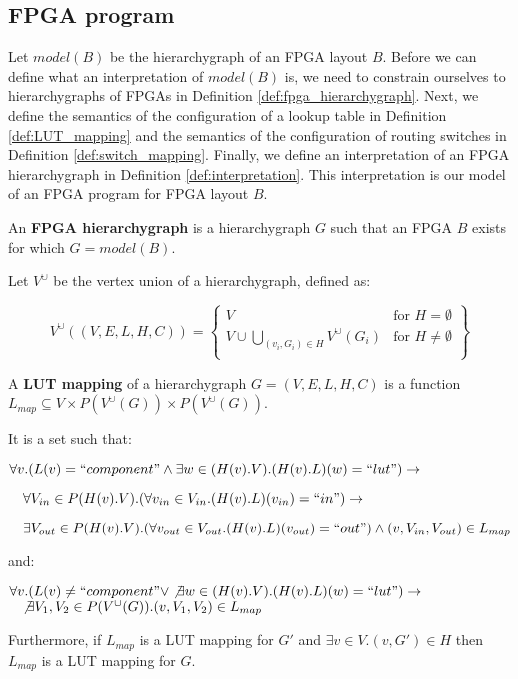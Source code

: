 \subsection{FPGA program}
Let $model(B)$ be the hierarchygraph of an FPGA layout $B$. Before we can define what an interpretation of $model(B)$ is, we need to constrain ourselves to hierarchygraphs of FPGAs in Definition \ref{def:fpga_hierarchygraph}. Next, we define the semantics of the configuration of a lookup table in Definition \ref{def:LUT_mapping} and the semantics of the configuration of routing switches in Definition \ref{def:switch_mapping}. Finally, we define an interpretation of an FPGA hierarchygraph in Definition \ref{def:interpretation}. This interpretation is our model of an FPGA program for FPGA layout $B$.


\begin{defn}
\label{def:fpga_hierarchygraph}
An \textbf{FPGA hierarchygraph} is a hierarchygraph $G$ such that an FPGA $B$ exists for which $G=model(B)$.
\end{defn}


\begin{defn}
Let $V^{\cup}$ be the vertex union of a hierarchygraph, defined as:

\[
    V^{\cup}((V, E, L, H, C)) = \left\{\begin{array}{lr}
        V   & \text{for } H=\emptyset\\
        V \cup \bigcup\limits_{(v_i, G_i)\in H} V^{\cup}(G_i) & \text{for } H\neq \emptyset\\
\end{array}\right\}
  \]
\end{defn}

\begin{defn}
\label{def:LUT_mapping}
A \textbf{LUT mapping} of a hierarchygraph $G=(V, E, L, H, C)$ is a function $L_{map} \subseteq V \times P(V^{\cup}(G)) \times P(V^{\cup}(G))$. 

It is a set such that:
\vspace{10pt}

$\forall v. (L(v) = ``component" \land \exists w \in (H(v).V). (H(v).L)(w)=``lut") \to$

$\quad \forall V_{in}  \in P(H(v).V) . (\forall v_{in} \in V_{in} .(H(v).L)(v_{in})=``in") \to$

$\quad \exists V_{out} \in P(H(v).V) . (\forall v_{out} \in V_{out} . (H(v).L)(v_{out})=``out") \land (v, V_{in}, V_{out}) \in L_{map}$

\vspace{10pt}
and:
\vspace{10pt}

$\forall v. (L(v) \neq ``component" \lor \not \exists w \in (H(v).V). (H(v).L)(w)=``lut") \to$
$\quad \not \exists V_1, V_2 \in P(V^{\cup}(G)) . (v, V_1, V_2) \in L_{map}$
\vspace{10pt}

Furthermore, if $L_{map}$ is a LUT mapping for $G'$ and $\exists v \in V. (v,G') \in H$ then $L_{map}$ is a LUT mapping for $G$.
\end{defn}

